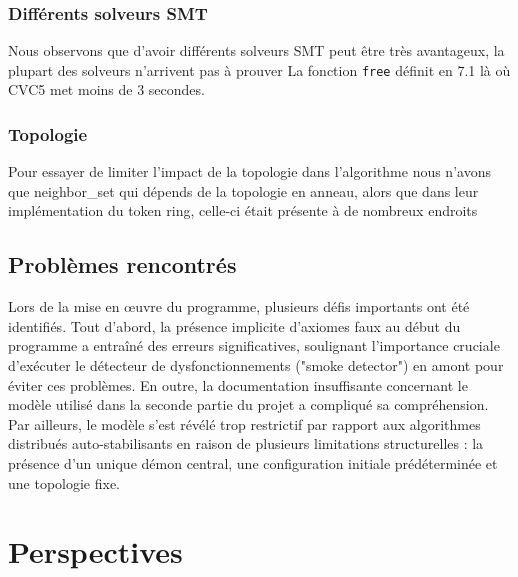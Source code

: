 \documentclass[11pt]{article}
\begin{document}
\subsubsection{Différents solveurs SMT}
\label{sec:org71b1b60}
Nous observons que d'avoir différents solveurs SMT peut être très avantageux, la plupart des solveurs n'arrivent pas à prouver
La fonction \texttt{free} définit en 7.1 là où CVC5 met moins de 3 secondes.

\subsubsection{Topologie}
\label{sec:org4acdc9f}

Pour essayer de limiter l'impact de la topologie dans l'algorithme nous n'avons que 
neighbor\_set qui dépends de la topologie en anneau,
alors que dans leur implémentation du token ring, celle-ci était présente à de nombreux endroits
\subsection{Problèmes rencontrés}
\label{sec:org02bdcd8}

Lors de la mise en œuvre du programme, plusieurs défis importants ont été identifiés. 
Tout d'abord, la présence implicite d'axiomes faux au début du programme a entraîné des erreurs significatives, 
soulignant l'importance cruciale d'exécuter le détecteur de dysfonctionnements ("smoke detector") en amont pour éviter ces problèmes. 
En outre, la documentation insuffisante concernant le modèle utilisé dans la seconde partie du projet a compliqué sa compréhension. 
Par ailleurs, le modèle s'est révélé trop restrictif par rapport aux algorithmes distribués auto-stabilisants en raison de plusieurs limitations structurelles : 
la présence d'un unique démon central, une configuration initiale prédéterminée et une topologie fixe. 

\section{Perspectives}
\label{sec:orgfed6d62}
\end{document}
